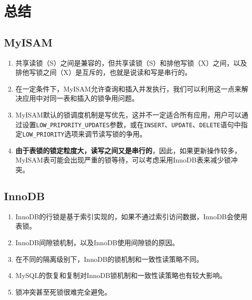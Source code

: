 \documentclass[UTF8,a4paper,12pt]{ctexbook}
\begin{document}
	\section{总结}
		\subsection{MyISAM}
			\begin{enumerate}
				\item 共享读锁（S）之间是兼容的，但共享读锁（S）和排他写锁（X）之间，以及排他写锁之间（X）是互斥的，也就是说读和写是串行的。
				\item 在一定条件下，MyISAM允许查询和插入并发执行，我们可以利用这一点来解决应用中对同一表和插入的锁争用问题。
				\item MyISAM默认的锁调度机制是写优先，这并不一定适合所有应用，用户可以通过设置\verb|LOW_PRIPORITY_UPDATES|参数，或在\verb|INSERT|、\verb|UPDATE|、\verb|DELETE|语句中指定\verb|LOW_PRIORITY|选项来调节读写锁的争用。
				\item \textbf{由于表锁的锁定粒度大，读写之间又是串行的}，因此，如果更新操作较多，MyISAM表可能会出现严重的锁等待，可以考虑采用InnoDB表来减少锁冲突。
			\end{enumerate}
		
		
		\subsection{InnoDB}
			\begin{enumerate}
				\item InnoDB的行锁是基于索引实现的，如果不通过索引访问数据，InnoDB会使用表锁。
				\item InnoDB间隙锁机制，以及InnoDB使用间隙锁的原因。
				\item 在不同的隔离级别下，InnoDB的锁机制和一致性读策略不同。
				\item MySQL的恢复和复制对InnoDB锁机制和一致性读策略也有较大影响。
				\item 锁冲突甚至死锁很难完全避免。
			\end{enumerate}
			
\end{document}
